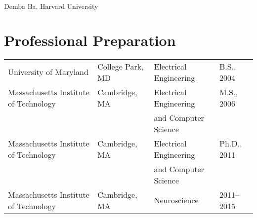 \documentclass[11pt]{article}
\makeatletter
\let\saved@bibitem\@bibitem %
\def\HCode#1{}
\def\name{Demba Ba}
\renewenvironment{itemize}{
  \begin{list}{}{
    \setlength{\itemsep}{0.25em}
    \setlength{\parskip}{0pt}
    \setlength{\parsep}{0.25em}
  }
}{
  \end{list}
}
\makeatother
\begin{document}
\sloppy

\begingroup
\makeatletter
\let\@bibitem\saved@bibitem %
\endgroup

\HCode{<div class="fluid-container"}

\HCode{<div class="row">}
\HCode{<div class="col-md-12">}
\HCode{<h1>}
{\Large \name, Harvard University}
\HCode{</h1>}
\HCode{</div>} %
\HCode{</div>} %

%

\HCode{<div class="row">}
\HCode{<div class="col-md-12">}
\section*{Professional Preparation}


\begin{tabular}{llll}
University of Maryland & College Park, MD & Electrical Engineering & B.S., 2004 \\
Massachusetts Institute of Technology & Cambridge, MA & Electrical Engineering & M.S., 2006 \\
 &  & and Computer Science & \\
Massachusetts Institute of Technology & Cambridge, MA & Electrical Engineering & Ph.D., 2011 \\
 &  & and Computer Science & \\
Massachusetts Institute of Technology & Cambridge, MA & Neuroscience & 2011--2015
\end{tabular}
\end{document}
